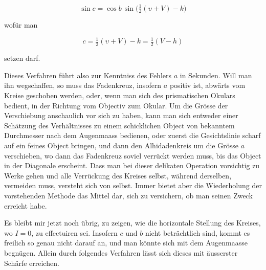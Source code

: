 \[ \sin c = \cos b\,\sin\bigl(\tfrac{1}{2}(\upsilon+V)-k\bigr) \]

\noindent wofür man

\[ c = \tfrac{1}{2}(\upsilon+V)-k = \tfrac{1}{2}(V-h) \]

\noindent setzen darf.

\par\indent Dieses Verfahren führt also zur Kenntniss des Fehlers $a$ in Sekunden. Will man ihn wegschaffen, so muss das Fadenkreuz, insofern $a$ positiv ist, abwärts vom Kreise geschoben werden, oder, wenn man sich des prismatischen Okulars bedient, in der Richtung vom Objectiv zum Okular. Um die Grösse der Verschiebung anschaulich vor sich zu haben, kann man sich entweder einer Schätzung des Verhältnisses zu einem schicklichen Object von bekanntem Durchmesser nach dem Augenmaass bedienen, oder zuerst die Gesichtslinie scharf auf ein feines Object bringen, und dann den Alhidadenkreis um die Grösse $a$ verschieben, wo dann das Fadenkreuz soviel verrückt werden muss, bis das Object in der Diagonale erscheint. Dass man bei dieser delikaten Operation vorsichtig zu Werke gehen und alle Verrückung des Kreises selbst, während derselben, vermeiden muss, versteht sich von selbst. Immer bietet aber die Wiederholung der vorstehenden Methode das Mittel dar, sich zu versichern, ob man seinen Zweck erreicht habe.

\par\indent Es bleibt mir jetzt noch übrig, zu zeigen, wie die horizontale Stellung des Kreises, wo $I=0$, zu effectuiren sei. Insofern $c$ und $b$ nicht beträchtlich sind, kommt es freilich so genau nicht darauf an, und man könnte sich mit dem Augenmaasse begnügen. Allein durch folgendes Verfahren lässt sich dieses mit äusserster Schärfe erreichen.

